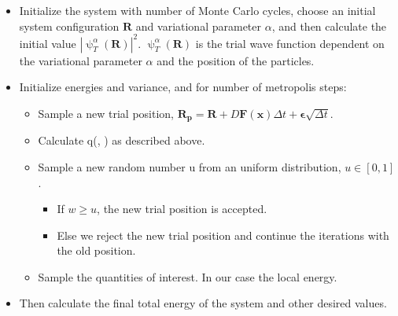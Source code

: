 \begin{itemize}
    \item Initialize the system with number of Monte Carlo cycles, choose an initial system configuration $\boldsymbol{R}$ and variational parameter $\alpha$, and then calculate the initial value $|\uppsi_T^\alpha(\boldsymbol{R})|^2$. $\uppsi_T^\alpha(\boldsymbol{R})$ is the trial wave function dependent on the variational parameter $\alpha$ and the position of the particles. 
    \item Initialize energies and variance, and for number of metropolis steps:
    \begin{itemize}
        \item Sample a new trial position, $\boldsymbol{R_p} = \boldsymbol{R} + D \boldsymbol{F(x)}\Delta t + \boldsymbol{\epsilon} \sqrt{\Delta t}$.
        \item Calculate q(, ) as described above. 
        \item Sample a new random number u from an uniform distribution, $u \in [0,1]$. 
        \begin{itemize}
            \item If $w \geq u$, the new trial position is accepted.
            \item Else we reject the new trial position and continue the iterations with the old position. 
        \end{itemize}
        \item Sample the quantities of interest. In our case the local energy.
    \end{itemize}
    \item Then calculate the final total energy of the system and other desired values. 
\end{itemize}


